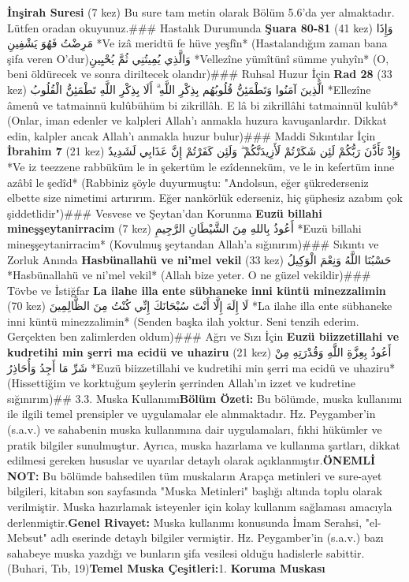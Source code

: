\documentclass[12pt,a4paper]{article}
\begin{document}
\textbf{İnşirah Suresi} (7 kez)
Bu sure tam metin olarak Bölüm 5.6'da yer almaktadır. Lütfen oradan okuyunuz.\#\#\# Hastalık Durumunda
\textbf{Şuara 80-81} (41 kez)
وَإِذَا مَرِضْتُ فَهُوَ يَشْفِينِ
*Ve izâ meridtü fe hüve yeşfîn*
(Hastalandığım zaman bana şifa veren O'dur)وَالَّذِي يُمِيتُنِي ثُمَّ يُحْيِينِ
*Vellezîne yümîtünî sümme yuhyîn*
(O, beni öldürecek ve sonra diriltecek olandır)\#\#\# Ruhsal Huzur İçin
\textbf{Rad 28} (33 kez)
الَّذِينَ آمَنُوا وَتَطْمَئِنُّ قُلُوبُهُم بِذِكْرِ اللَّهِ ۗ أَلَا بِذِكْرِ اللَّهِ تَطْمَئِنُّ الْقُلُوبُ
*Ellezîne âmenû ve tatmainnü kulûbühüm bi zikrillâh. E lâ bi zikrillâhi tatmainnül kulûb*
(Onlar, iman edenler ve kalpleri Allah'ı anmakla huzura kavuşanlardır. Dikkat edin, kalpler ancak Allah'ı anmakla huzur bulur)\#\#\# Maddi Sıkıntılar İçin
\textbf{İbrahim 7} (21 kez)
وَإِذْ تَأَذَّنَ رَبُّكُمْ لَئِن شَكَرْتُمْ لَأَزِيدَنَّكُمْ ۖ وَلَئِن كَفَرْتُمْ إِنَّ عَذَابِي لَشَدِيدٌ
*Ve iz teezzene rabbüküm le in şekertüm le ezîdenneküm, ve le in kefertüm inne azâbî le şedîd*
(Rabbiniz şöyle duyurmuştu: "Andolsun, eğer şükrederseniz elbette size nimetimi artırırım. Eğer nankörlük ederseniz, hiç şüphesiz azabım çok şiddetlidir")\#\#\# Vesvese ve Şeytan'dan Korunma
\textbf{Euzü billahi mineşşeytanirracim} (7 kez)
أَعُوذُ بِاللهِ مِنَ الشَّيْطَانِ الرَّجِيمِ
*Euzü billahi mineşşeytanirracim*
(Kovulmuş şeytandan Allah'a sığınırım)\#\#\# Sıkıntı ve Zorluk Anında
\textbf{Hasbünallahü ve ni'mel vekil} (33 kez)
حَسْبُنَا اللَّهُ وَنِعْمَ الْوَكِيلُ
*Hasbünallahü ve ni'mel vekil*
(Allah bize yeter. O ne güzel vekildir)\#\#\# Tövbe ve İstiğfar
\textbf{La ilahe illa ente sübhaneke inni küntü minezzalimin} (70 kez)
لَا إِلَهَ إِلَّا أَنْتَ سُبْحَانَكَ إِنِّي كُنْتُ مِنَ الظَّالِمِينَ
*La ilahe illa ente sübhaneke inni küntü minezzalimin*
(Senden başka ilah yoktur. Seni tenzih ederim. Gerçekten ben zalimlerden oldum)\#\#\# Ağrı ve Sızı İçin
\textbf{Euzü biizzetillahi ve kudretihi min şerri ma ecidü ve uhaziru} (21 kez)
أَعُوذُ بِعِزَّةِ اللَّهِ وَقُدْرَتِهِ مِنْ شَرِّ مَا أَجِدُ وَأُحَاذِرُ
*Euzü biizzetillahi ve kudretihi min şerri ma ecidü ve uhaziru*
(Hissettiğim ve korktuğum şeylerin şerrinden Allah'ın izzet ve kudretine sığınırım)\#\# 3.3. Muska Kullanımı\textbf{Bölüm Özeti:}
Bu bölümde, muska kullanımı ile ilgili temel prensipler ve uygulamalar ele alınmaktadır. Hz. Peygamber'in (s.a.v.) ve sahabenin muska kullanımına dair uygulamaları, fıkhi hükümler ve pratik bilgiler sunulmuştur. Ayrıca, muska hazırlama ve kullanma şartları, dikkat edilmesi gereken hususlar ve uyarılar detaylı olarak açıklanmıştır.\textbf{ÖNEMLİ NOT:} Bu bölümde bahsedilen tüm muskaların Arapça metinleri ve sure-ayet bilgileri, kitabın son sayfasında "Muska Metinleri" başlığı altında toplu olarak verilmiştir. Muska hazırlamak isteyenler için kolay kullanım sağlaması amacıyla derlenmiştir.\textbf{Genel Rivayet:} Muska kullanımı konusunda İmam Serahsi, "el-Mebsut" adlı eserinde detaylı bilgiler vermiştir. Hz. Peygamber'in (s.a.v.) bazı sahabeye muska yazdığı ve bunların şifa vesilesi olduğu hadislerle sabittir. (Buhari, Tıb, 19)\textbf{Temel Muska Çeşitleri:}1. \textbf{Koruma Muskası}
\end{document}
